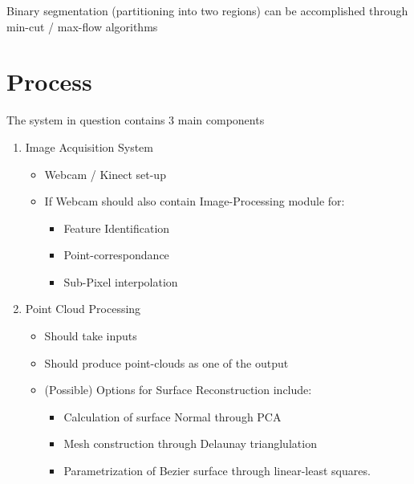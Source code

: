 \documentclass{report}
\begin{document}
Binary segmentation (partitioning into two regions) can be accomplished through
min-cut / max-flow algorithms	
\chapter{Process}
The system in question contains 3 main components
\begin{enumerate}
	\item Image Acquisition System
	\begin{itemize}
		\item Webcam / Kinect set-up
		\item If Webcam should also contain Image-Processing module for:
		\begin{itemize}
			\item Feature Identification
			\item Point-correspondance
			\item Sub-Pixel interpolation
		\end{itemize}
	\end{itemize}
	\item Point Cloud Processing
	\begin{itemize}
		\item Should take inputs
		\item Should produce point-clouds as one of the output
		\item (Possible) Options for Surface Reconstruction include:
		\begin{itemize}
			\item Calculation of surface Normal through PCA
			\item Mesh construction through Delaunay trianglulation
			\item Parametrization of Bezier surface through linear-least squares.
		\end{itemize}

	\end{itemize}

\end{enumerate}

\begin{equation*}
\end{equation*}


%
\end{document}
